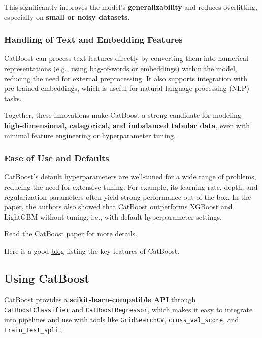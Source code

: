 \documentclass[
  letterpaper,
  DIV=11,
  numbers=noendperiod]{scrreprt}
\begin{document}
This significantly improves the model's \textbf{generalizability} and
reduces overfitting, especially on \textbf{small or noisy datasets}.

\subsubsection{Handling of Text and Embedding
Features}\label{handling-of-text-and-embedding-features}

CatBoost can process text features directly by converting them into
numerical representations (e.g., using bag-of-words or embeddings)
within the model, reducing the need for external preprocessing. It also
supports integration with pre-trained embeddings, which is useful for
natural language processing (NLP) tasks.

Together, these innovations make CatBoost a strong candidate for
modeling \textbf{high-dimensional, categorical, and imbalanced tabular
data}, even with minimal feature engineering or hyperparameter tuning.

\subsubsection{Ease of Use and Defaults}\label{ease-of-use-and-defaults}

CatBoost's default hyperparameters are well-tuned for a wide range of
problems, reducing the need for extensive tuning. For example, its
learning rate, depth, and regularization parameters often yield strong
performance out of the box. In the paper, the authors also showed that
CatBoost outperforms XGBoost and LightGBM without tuning, i.e., with
default hyperparameter settings.

Read the
\href{https://proceedings.neurips.cc/paper_files/paper/2018/file/14491b756b3a51daac41c24863285549-Paper.pdf}{CatBoost
paper} for more details.

Here is a good
\href{https://neptune.ai/blog/when-to-choose-catboost-over-xgboost-or-lightgbm}{blog}
listing the key features of CatBoost.

\subsection{Using CatBoost}\label{using-catboost}

CatBoost provides a \textbf{scikit-learn-compatible API} through
\texttt{CatBoostClassifier} and \texttt{CatBoostRegressor}, which makes
it easy to integrate into pipelines and use with tools like
\texttt{GridSearchCV}, \texttt{cross\_val\_score}, and
\texttt{train\_test\_split}.
\end{document}
